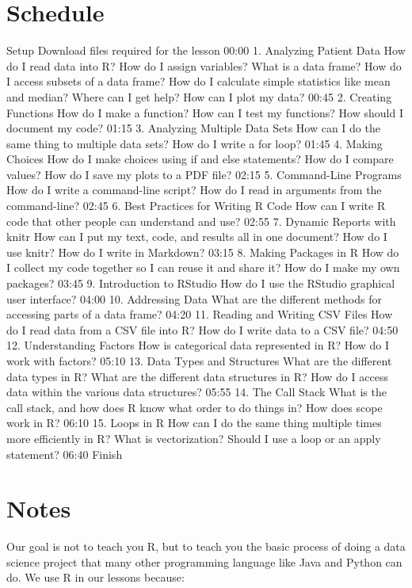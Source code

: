 \documentclass[
]{book}
\begin{document}
\hypertarget{schedule}{%
\section{Schedule}\label{schedule}}

Setup Download files required for the lesson
00:00 1. Analyzing Patient Data How do I read data into R?
How do I assign variables?
What is a data frame?
How do I access subsets of a data frame?
How do I calculate simple statistics like mean and median?
Where can I get help?
How can I plot my data?
00:45 2. Creating Functions How do I make a function?
How can I test my functions?
How should I document my code?
01:15 3. Analyzing Multiple Data Sets How can I do the same thing to multiple data sets?
How do I write a for loop?
01:45 4. Making Choices How do I make choices using if and else statements?
How do I compare values?
How do I save my plots to a PDF file?
02:15 5. Command-Line Programs How do I write a command-line script?
How do I read in arguments from the command-line?
02:45 6. Best Practices for Writing R Code How can I write R code that other people can understand and use?
02:55 7. Dynamic Reports with knitr How can I put my text, code, and results all in one document?
How do I use knitr?
How do I write in Markdown?
03:15 8. Making Packages in R How do I collect my code together so I can reuse it and share it?
How do I make my own packages?
03:45 9. Introduction to RStudio How do I use the RStudio graphical user interface?
04:00 10. Addressing Data What are the different methods for accessing parts of a data frame?
04:20 11. Reading and Writing CSV Files How do I read data from a CSV file into R?
How do I write data to a CSV file?
04:50 12. Understanding Factors How is categorical data represented in R?
How do I work with factors?
05:10 13. Data Types and Structures What are the different data types in R?
What are the different data structures in R?
How do I access data within the various data structures?
05:55 14. The Call Stack What is the call stack, and how does R know what order to do things in?
How does scope work in R?
06:10 15. Loops in R How can I do the same thing multiple times more efficiently in R?
What is vectorization?
Should I use a loop or an apply statement?
06:40 Finish

\hypertarget{notes}{%
\section{Notes}\label{notes}}

Our goal is not to teach you R, but to teach you the basic process of doing a data science project that many other programming language like Java and Python can do. We use R in our lessons because:
\end{document}
